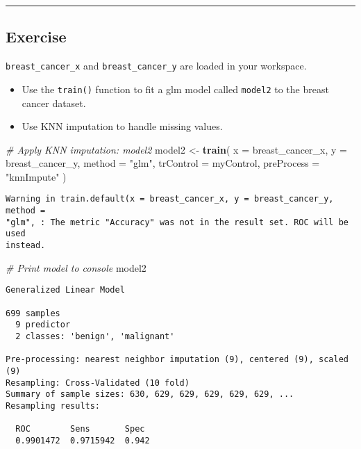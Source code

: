 \documentclass[]{book}
\newenvironment{Shaded}{\begin{snugshade}}{\end{snugshade}}
\newcommand{\KeywordTok}[1]{\textcolor[rgb]{0.13,0.29,0.53}{\textbf{#1}}}
\newcommand{\DataTypeTok}[1]{\textcolor[rgb]{0.13,0.29,0.53}{#1}}
\newcommand{\StringTok}[1]{\textcolor[rgb]{0.31,0.60,0.02}{#1}}
\newcommand{\CommentTok}[1]{\textcolor[rgb]{0.56,0.35,0.01}{\textit{#1}}}
\newcommand{\NormalTok}[1]{#1}
\begin{document}
\begin{center}\rule{0.5\linewidth}{\linethickness}\end{center}

\subsection*{Exercise}\label{exercise-24}

\texttt{breast\_cancer\_x} and \texttt{breast\_cancer\_y} are loaded in
your workspace.

\begin{itemize}
\item
  Use the \texttt{train()} function to fit a glm model called
  \texttt{model2} to the breast cancer dataset.
\item
  Use KNN imputation to handle missing values.
\end{itemize}

\begin{Shaded}
\begin{Highlighting}[]
\CommentTok{# Apply KNN imputation: model2}
\NormalTok{model2 <-}\StringTok{ }\KeywordTok{train}\NormalTok{(}
  \DataTypeTok{x =}\NormalTok{ breast_cancer_x, }\DataTypeTok{y =}\NormalTok{ breast_cancer_y,}
  \DataTypeTok{method =} \StringTok{"glm"}\NormalTok{,}
  \DataTypeTok{trControl =}\NormalTok{ myControl,}
  \DataTypeTok{preProcess =} \StringTok{"knnImpute"}
\NormalTok{)}
\end{Highlighting}
\end{Shaded}

\begin{verbatim}
Warning in train.default(x = breast_cancer_x, y = breast_cancer_y, method =
"glm", : The metric "Accuracy" was not in the result set. ROC will be used
instead.
\end{verbatim}

\begin{Shaded}
\begin{Highlighting}[]
\CommentTok{# Print model to console}
\NormalTok{model2}
\end{Highlighting}
\end{Shaded}

\begin{verbatim}
Generalized Linear Model 

699 samples
  9 predictor
  2 classes: 'benign', 'malignant' 

Pre-processing: nearest neighbor imputation (9), centered (9), scaled (9) 
Resampling: Cross-Validated (10 fold) 
Summary of sample sizes: 630, 629, 629, 629, 629, 629, ... 
Resampling results:

  ROC        Sens       Spec 
  0.9901472  0.9715942  0.942
\end{verbatim}
\end{document}
